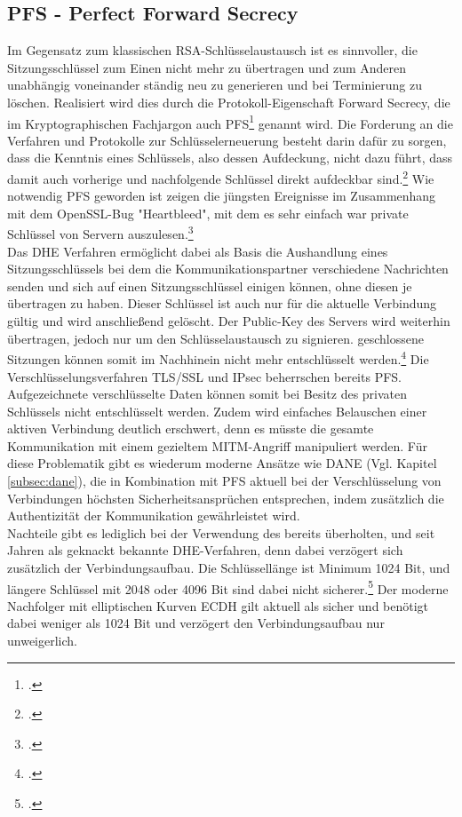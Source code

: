 \documentclass  [paper=a4,
				fontsize=12pt,
				listof=totoc,
				bibliography=totoc
				]{scrreprt}
\begin{document}
			\subsection{PFS - Perfect Forward Secrecy}
				Im Gegensatz zum klassischen RSA-Schlüsselaustausch ist es sinnvoller, die Sitzungsschlüssel
				zum Einen nicht mehr zu übertragen und zum Anderen unabhängig voneinander ständig neu zu generieren und bei Terminierung zu löschen. Realisiert wird dies durch die Protokoll-Eigenschaft Forward Secrecy, die im Kryptographischen Fachjargon auch \ac{PFS}\footcite[Vgl.][]{Boeck2013} genannt wird. Die \glqq Forderung an die Verfahren und Protokolle zur Schlüsselerneuerung besteht darin dafür zu sorgen, dass die Kenntnis eines Schlüssels, also dessen Aufdeckung, nicht dazu führt, dass damit auch vorherige und nachfolgende Schlüssel direkt aufdeckbar sind.\grqq\footcite[Vgl.][S. 439]{Eckert2013} Wie notwendig \ac{PFS} geworden ist zeigen die jüngsten Ereignisse im Zusammenhang mit dem OpenSSL-Bug "Heartbleed", mit dem es sehr einfach war private Schlüssel von Servern auszulesen.\footcite[Vgl.][]{Zhu2014} \medskip\\
				Das \ac{DHE} Verfahren ermöglicht dabei als Basis die Aushandlung eines Sitzungsschlüssels bei dem die Kommunikationspartner verschiedene Nachrichten senden und sich auf einen Sitzungsschlüssel einigen können, ohne diesen je übertragen zu haben. Dieser Schlüssel ist auch nur für die aktuelle Verbindung gültig und wird anschließend gelöscht. Der Public-Key des Servers wird weiterhin übertragen, jedoch nur um den Schlüsselaustausch zu signieren. \glqq geschlossene Sitzungen können somit im Nachhinein nicht mehr entschlüsselt werden.\grqq \footcite[Vgl.][]{Schulz2014} Die Verschlüsselungsverfahren \ac{TLS/SSL} und \ac{IPsec} beherrschen bereits \ac{PFS}.\medskip\\
				Aufgezeichnete verschlüsselte Daten können somit bei Besitz des privaten Schlüssels nicht entschlüsselt werden. Zudem wird einfaches Belauschen einer aktiven Verbindung deutlich erschwert, denn es müsste die gesamte Kommunikation mit einem gezieltem \ac{MITM}-Angriff manipuliert werden. Für diese Problematik gibt es wiederum moderne Ansätze wie \ac{DANE} (Vgl. Kapitel \ref{subsec:dane}), die in Kombination mit \ac{PFS} aktuell bei der Verschlüsselung von Verbindungen höchsten Sicherheitsansprüchen entsprechen, indem zusätzlich die Authentizität der Kommunikation gewährleistet wird.\medskip\\
				Nachteile gibt es lediglich bei der Verwendung des bereits überholten, und seit Jahren als geknackt bekannte \ac{DHE}-Verfahren, denn dabei verzögert sich zusätzlich der Verbindungsaufbau. Die Schlüssellänge ist Minimum 1024 Bit, und längere Schlüssel mit 2048 oder 4096 Bit sind dabei nicht sicherer.\footcite[Vgl.][]{Boeck2013} Der moderne Nachfolger mit elliptischen Kurven \ac{ECDH} gilt aktuell als sicher und benötigt dabei weniger als 1024 Bit und verzögert den Verbindungsaufbau nur unweigerlich.\medskip\\
\end{document}
